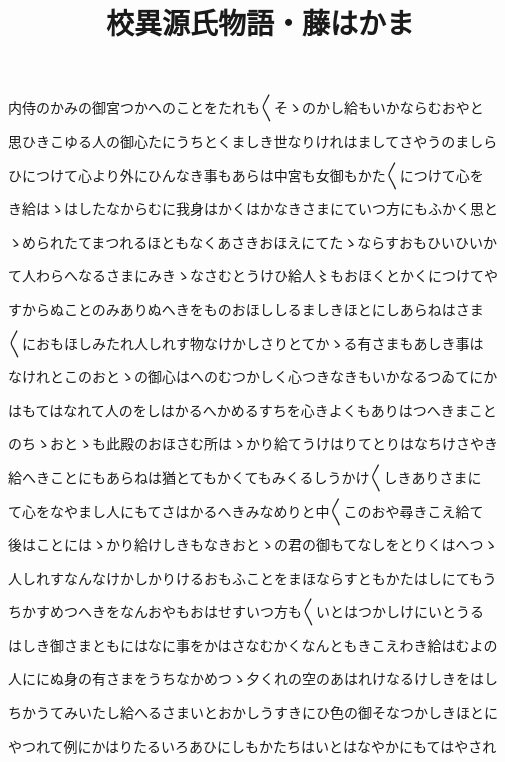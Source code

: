 \documentclass[a4paper,11pt,landscape]{ltjtarticle}
\title{校異源氏物語・藤はかま}
\date{}
\begin{document}
\maketitle

内侍のかみの御宮つかへのことをたれも〱そゝのかし給もいかならむおやと
\par\medskip
思ひきこゆる人の御心たにうちとくましき世なりけれはましてさやうのましら
\par\medskip
ひにつけて心より外にひんなき事もあらは中宮も女御もかた〱につけて心を
\par\medskip
き給はゝはしたなからむに我身はかくはかなきさまにていつ方にもふかく思と
\par\medskip
ゝめられたてまつれるほともなくあさきおほえにてたゝならすおもひいひいか
\par\medskip
て人わらへなるさまにみきゝなさむとうけひ給人〻もおほくとかくにつけてや
\par\medskip
すからぬことのみありぬへきをものおほししるましきほとにしあらねはさま
\par\medskip
〱におもほしみたれ人しれす物なけかしさりとてかゝる有さまもあしき事は
\par\medskip
なけれとこのおとゝの御心はへのむつかしく心つきなきもいかなるつゐてにか
\par\medskip
はもてはなれて人のをしはかるへかめるすちを心きよくもありはつへきまこと
\par\medskip
のちゝおとゝも此殿のおほさむ所はゝかり給てうけはりてとりはなちけさやき
\par\medskip
給へきことにもあらねは猶とてもかくてもみくるしうかけ〱しきありさまに
\par\medskip
て心をなやまし人にもてさはかるへきみなめりと中〱このおや尋きこえ給て
\par\medskip
後はことにはゝかり給けしきもなきおとゝの君の御もてなしをとりくはへつゝ
\par\medskip
人しれすなんなけかしかりけるおもふことをまほならすともかたはしにてもう
\par\medskip
ちかすめつへきをなんおやもおはせすいつ方も〱いとはつかしけにいとうる
\par\medskip
はしき御さまともにはなに事をかはさなむかくなんともきこえわき給はむよの
\par\medskip
人ににぬ身の有さまをうちなかめつゝ夕くれの空のあはれけなるけしきをはし
\par\medskip
ちかうてみいたし給へるさまいとおかしうすきにひ色の御そなつかしきほとに
\par\medskip
やつれて例にかはりたるいろあひにしもかたちはいとはなやかにもてはやされ
\end{document}

